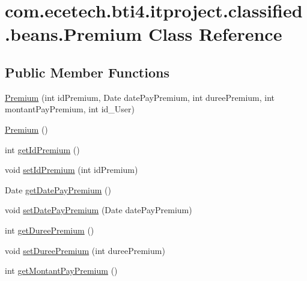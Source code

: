 \hypertarget{classcom_1_1ecetech_1_1bti4_1_1itproject_1_1classified_1_1beans_1_1_premium}{}\section{com.\+ecetech.\+bti4.\+itproject.\+classified.\+beans.\+Premium Class Reference}
\label{classcom_1_1ecetech_1_1bti4_1_1itproject_1_1classified_1_1beans_1_1_premium}
\subsection*{Public Member Functions}
\begin{DoxyCompactItemize}
\item 
\hyperlink{classcom_1_1ecetech_1_1bti4_1_1itproject_1_1classified_1_1beans_1_1_premium_ae0246a5431bb7775e739eec4da8282b0}{Premium} (int id\+Premium, Date date\+Pay\+Premium, int duree\+Premium, int montant\+Pay\+Premium, int id\+\_\+\+User)
\item 
\hyperlink{classcom_1_1ecetech_1_1bti4_1_1itproject_1_1classified_1_1beans_1_1_premium_ad07b5023545550dc53ac695ddc3d41e8}{Premium} ()
\item 
int \hyperlink{classcom_1_1ecetech_1_1bti4_1_1itproject_1_1classified_1_1beans_1_1_premium_a1cf045747d0b7762ea86f8d8f1f502ff}{get\+Id\+Premium} ()
\item 
void \hyperlink{classcom_1_1ecetech_1_1bti4_1_1itproject_1_1classified_1_1beans_1_1_premium_ab0b1e71196288d854692e804f9f2a166}{set\+Id\+Premium} (int id\+Premium)
\item 
Date \hyperlink{classcom_1_1ecetech_1_1bti4_1_1itproject_1_1classified_1_1beans_1_1_premium_a18494e3c979bbe135528a5e265594d76}{get\+Date\+Pay\+Premium} ()
\item 
void \hyperlink{classcom_1_1ecetech_1_1bti4_1_1itproject_1_1classified_1_1beans_1_1_premium_ae864a611e032fec5c20609d72f9d59b4}{set\+Date\+Pay\+Premium} (Date date\+Pay\+Premium)
\item 
int \hyperlink{classcom_1_1ecetech_1_1bti4_1_1itproject_1_1classified_1_1beans_1_1_premium_ad1f3a1e6d4c457eb09092a7ae4dbc6c9}{get\+Duree\+Premium} ()
\item 
void \hyperlink{classcom_1_1ecetech_1_1bti4_1_1itproject_1_1classified_1_1beans_1_1_premium_a17decfd8474e6777ead78ef654c73073}{set\+Duree\+Premium} (int duree\+Premium)
\item 
int \hyperlink{classcom_1_1ecetech_1_1bti4_1_1itproject_1_1classified_1_1beans_1_1_premium_ac92e855f8b79c6092c2bfc58bc5766a4}{get\+Montant\+Pay\+Premium} ()

\end{DoxyCompactItemize}
